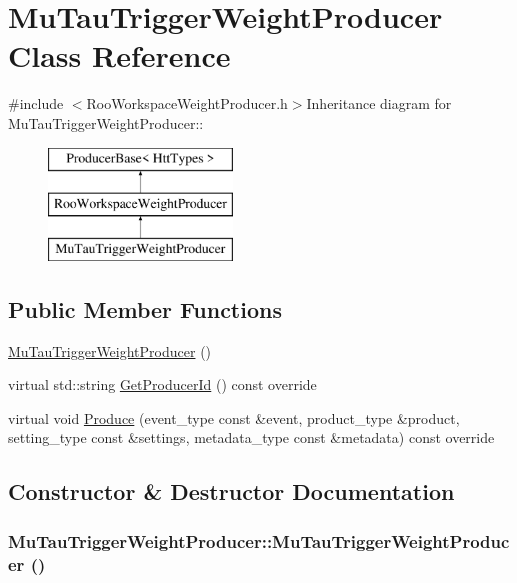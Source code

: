 \hypertarget{classMuTauTriggerWeightProducer}{
\section{MuTauTriggerWeightProducer Class Reference}
\label{classMuTauTriggerWeightProducer}
}


{\ttfamily \#include $<$RooWorkspaceWeightProducer.h$>$}Inheritance diagram for MuTauTriggerWeightProducer::\begin{figure}[H]
\begin{center}
\leavevmode
\includegraphics[height=3cm]{classMuTauTriggerWeightProducer}
\end{center}
\end{figure}
\subsection*{Public Member Functions}
\begin{DoxyCompactItemize}
\item 
\hyperlink{classMuTauTriggerWeightProducer_a7e95706bb1ce355538c6a6f9f6800676}{MuTauTriggerWeightProducer} ()
\item 
virtual std::string \hyperlink{classMuTauTriggerWeightProducer_ac7ed3993ecc2ad90b439b9aa9d478724}{GetProducerId} () const override
\item 
virtual void \hyperlink{classMuTauTriggerWeightProducer_a0401bf07b21eab934e0f9417b2316c5a}{Produce} (event\_\-type const \&event, product\_\-type \&product, setting\_\-type const \&settings, metadata\_\-type const \&metadata) const override
\end{DoxyCompactItemize}


\subsection{Constructor \& Destructor Documentation}
\hypertarget{classMuTauTriggerWeightProducer_a7e95706bb1ce355538c6a6f9f6800676}{
\subsubsection[{MuTauTriggerWeightProducer}]{\setlength{\rightskip}{0pt plus 5cm}MuTauTriggerWeightProducer::MuTauTriggerWeightProducer ()}}
\label{classMuTauTriggerWeightProducer_a7e95706bb1ce355538c6a6f9f6800676}


